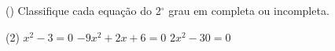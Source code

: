 \begin{question} () %
Classifique cada equação do 2$^\circ$ grau em completa ou incompleta.
    \begin{tasks}(2)
       \task $x^2-3=0$
        \task $-9x^2+2x+6=0$
        \task $2x^2-30=0$
    \end{tasks}
\end{question}